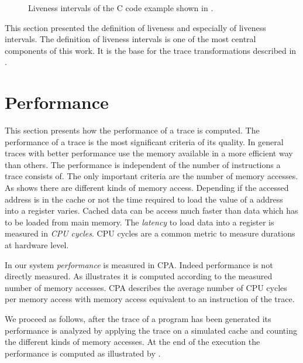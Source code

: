 \documentclass[onecolumn, openright, master, english, signatures]{dbrgrptt}
\begin{document}
\begin{figure}[!ht]
  \centering
  
  \caption{Liveness intervals of the C code example shown in .}
  \label{fig:liveness-intervals-example}
\end{figure}

This section presented the definition of liveness and especially of liveness intervals. The definition of liveness intervals is one of the most central components of this work. It is the base for the trace transformations described in .


\section{Performance}\label{sec:performance}

This section presents how the performance of a trace is computed. The performance of a trace is the most significant criteria of its quality. In general \ac{trace}s with better performance use the memory available in a more efficient way than others. The performance is independent of the number of instructions a \ac{trace} consists of. The only important criteria are the number of memory accesses. As  shows there are different kinds of memory access. Depending if the accessed address is in the cache or not the time required to load the value of a address into a register varies. Cached data can be access much faster than data which has to be loaded from main memory. The \emph{latency} to load data into a register is measured in \emph{\ac{CPU} cycles}. \ac{CPU} cycles are a common metric to measure durations at hardware level.

In our system \emph{performance} is measured in \ac{CPA}. Indeed performance is not directly measured. As  illustrates it is computed according to the measured number of memory accesses. \ac{CPA} describes the average number of \ac{CPU} cycles per memory access with memory access equivalent to an instruction of the trace.

We proceed as follows, after the \ac{trace} of a program has been generated its performance is analyzed by applying the trace on a simulated cache and counting the different kinds of memory accesses. At the end of the execution the performance is computed as illustrated by .
\end{document}

